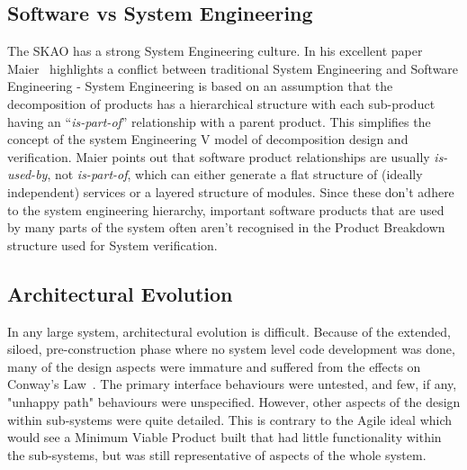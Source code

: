 \documentclass[a4paper,
               biblatex,     %
               keeplastbox,   %
               ]{jacow}
\begin{document}
\subsection{Software vs System Engineering}
The SKAO has a strong System Engineering culture. In his excellent paper Maier~\cite{Maier2006} highlights a conflict between traditional System Engineering and Software Engineering - System Engineering is based on an assumption that the decomposition of products has a hierarchical structure with each sub-product having an ``{\em is-part-of}'' relationship with a parent product. This simplifies the concept of the system Engineering V model of decomposition design and verification. Maier points out that software product relationships are usually {\em is-used-by}, not {\em is-part-of}, which can either generate a flat structure of (ideally independent) services or a layered structure of modules. Since these don't adhere to the system engineering hierarchy, important software products that are used by many parts of the system often aren't recognised in the Product Breakdown structure used for System verification.

\subsection{Architectural Evolution}
In any large system, architectural evolution is difficult. Because of the extended, siloed, pre-construction phase where no system level code development was done, many of the design aspects were immature and suffered from the effects on Conway's Law~\cite{Conway}. The primary interface behaviours were untested, and few, if any, "unhappy path" behaviours were unspecified. However, other aspects of the design within sub-systems were quite detailed. This is contrary to the Agile ideal which would see a Minimum Viable Product built that had little functionality within the sub-systems, but was still representative of aspects of the whole system. 



\end{document}
